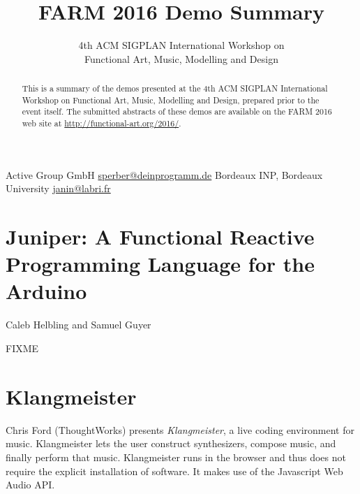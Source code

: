 \documentclass{sigplanconf}
\begin{document}
\toappear

\setlength{\pdfpageheight}{\paperheight}
\setlength{\pdfpagewidth}{\paperwidth}


\title{FARM 2016 Demo Summary}
\subtitle{4th ACM SIGPLAN International Workshop on \\ Functional Art, Music, Modelling and Design}

           {Active Group GmbH}
           {\url{sperber@deinprogramm.de}}
           {Bordeaux INP, Bordeaux University}
           {\url{janin@labri.fr}}

\maketitle

\begin{abstract}
  This is a summary of the demos presented at the 4th ACM SIGPLAN
  International Workshop on Functional Art, Music, Modelling and
  Design, prepared prior to the event itself.  The submitted abstracts
  of these demos are available on the FARM 2016 web site at
  \url{http://functional-art.org/2016/}.
\end{abstract}


\section{Juniper: A Functional Reactive Programming Language for the Arduino}

Caleb Helbling and Samuel Guyer

FIXME

\section{Klangmeister}

Chris Ford (ThoughtWorks) presents \textit{Klangmeister}, a live
coding environment for music.  Klangmeister lets the user construct
synthesizers, compose music, and finally perform that music.
Klangmeister runs in the browser and thus does not require the
explicit installation of software.  It makes use of the Javascript Web
Audio API.
\end{document}
